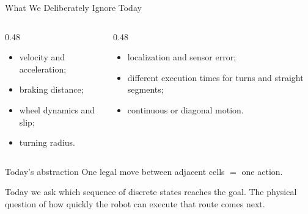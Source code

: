 \documentclass[aspectratio=169,10pt]{beamer}
\begin{document}
\begin{frame}[shrink=20]{What We Deliberately Ignore Today}
  \begin{columns}[T,onlytextwidth]
    \begin{column}{0.48\textwidth}
      \begin{itemize}
        \item velocity and acceleration;
        \item braking distance;
        \item wheel dynamics and slip;
        \item turning radius.
      \end{itemize}
    \end{column}

    \begin{column}{0.48\textwidth}
      \begin{itemize}
        \item localization and sensor error;
        \item different execution times for turns and straight segments;
        \item continuous or diagonal motion.
      \end{itemize}
    \end{column}
  \end{columns}

  \begin{block}{Today's abstraction}
    One legal move between adjacent cells $=$ one action.
  \end{block}

  \begin{keyidea}
    Today we ask which sequence of discrete states reaches the goal. The physical question of how quickly the robot can execute that route comes next.
  \end{keyidea}

\end{frame}
\end{document}
